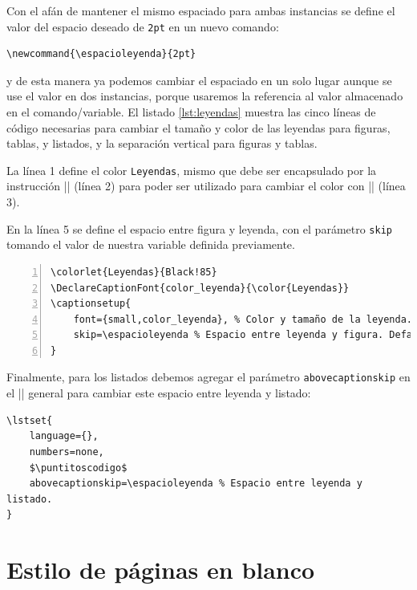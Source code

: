 Con el afán de mantener el mismo espaciado para ambas instancias se define el valor del espacio deseado de \texttt{2pt} en un nuevo comando:

\begin{lstlisting}[style=latex]
\newcommand{\espacioleyenda}{2pt}
\end{lstlisting}

\noindent y de esta manera ya podemos cambiar el espaciado en un solo lugar aunque se use el valor en dos instancias, porque usaremos la referencia al valor almacenado en el comando/variable. El listado \ref{lst:leyendas} muestra las cinco líneas de código necesarias para cambiar el tamaño y color de las leyendas para figuras, tablas, y listados, y la separación vertical para figuras y tablas.

La línea 1 define el color \texttt{Leyendas}, mismo que debe ser encapsulado por la instrucción |\DeclareCaptionFont| (línea 2) para poder ser utilizado para cambiar el color con |\captionsetup| (línea 3).

En la línea 5 se define el espacio entre figura y leyenda, con el parámetro \texttt{skip} tomando el valor de nuestra variable definida previamente.

\begin{lstlisting}[style=latex,numbers=left,label={lst:leyendas},caption={Configuración de las leyendas con paquete \texttt{caption}.}]
\colorlet{Leyendas}{Black!85}
\DeclareCaptionFont{color_leyenda}{\color{Leyendas}}
\captionsetup{
    font={small,color_leyenda}, % Color y tamaño de la leyenda.
    skip=\espacioleyenda % Espacio entre leyenda y figura. Default=10pt.
}
\end{lstlisting}

Finalmente, para los listados debemos agregar el parámetro \texttt{abovecaptionskip} en el |\lstset| general para cambiar este espacio entre leyenda y listado:

\begin{lstlisting}[style=latex]
\lstset{
    language={},
    numbers=none,
    $\puntitoscodigo$
	abovecaptionskip=\espacioleyenda % Espacio entre leyenda y listado.
}
\end{lstlisting}



\section{Estilo de páginas en blanco}
\label{sec:estilo_de_paginas_en_blanco}



